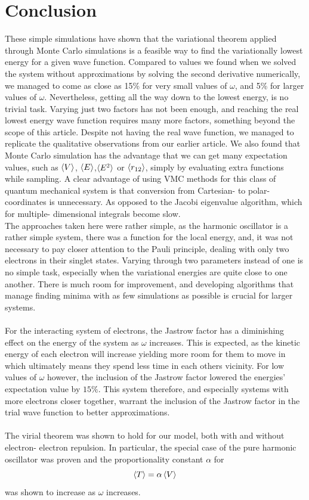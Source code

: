\documentclass[10pt,a4paper]{article}
\begin{document}
\section{Conclusion}
These simple simulations have shown that the variational theorem applied through Monte Carlo simulations is a feasible way to find the variationally lowest energy for a given wave function. Compared to values we found when we solved the system without approximations by solving the second derivative numerically, we managed to come as close as 15\% for very small values of $\omega$, and 5\% for larger values of $\omega$. Nevertheless, getting all the way down to the lowest energy, is no trivial task. Varying just two factors has not been enough, and reaching the real lowest energy wave function requires many more factors, something beyond the scope of this article. Despite not having the real wave function, we managed to replicate the qualitative observations from our earlier article. We also found that Monte Carlo simulation has the advantage that we can get many expectation values, such as $\braket{V}$, $\braket{E}$,$\braket{E^2}$ or $\braket{r_{12}}$, simply by evaluating extra functions while sampling. A clear advantage of using VMC methods for this class of quantum mechanical system is that conversion from Cartesian- to polar- coordinates is unnecessary. As opposed to the Jacobi eigenvalue algorithm, which for multiple- dimensional integrals become slow.\\The approaches taken here were rather simple, as the harmonic oscillator is a rather simple system, there was a function for the local energy, and, it was not necessary to pay closer attention to the Pauli principle, dealing with only two electrons in their singlet states. Varying through two parameters instead of one is no simple task, especially when the variational energies are quite close to one another. There is much room for improvement, and developing algorithms that manage finding minima with as few simulations as possible is crucial for larger systems.\\\\For the interacting system of electrons, the Jastrow factor has a diminishing effect on the energy of the system as $\omega$ increases. This is expected, as the kinetic energy of each electron will increase yielding more room for them to move in which ultimately means they spend less time in each others vicinity. For low values of $\omega$ however, the inclusion of the Jastrow factor lowered the energies' expectation value by $15\%$. This system therefore, and especially systems with more electrons closer together, warrant the inclusion of the Jastrow factor in the trial wave function to better approximations.\\\\The virial theorem was shown to hold for our model, both with and without electron- electron repulsion. In particular, the special case of the pure harmonic oscillator was proven and the proportionality constant $\alpha$ for
\begin{equation}
\braket{T} = \alpha \braket{V}
\end{equation}
was shown to increase as $\omega$ increases.
\end{document}
